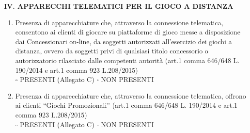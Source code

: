 \documentclass[12pt]{article}
\begin{document}
\begin{center}
    \textbf{IV. APPARECCHI TELEMATICI PER IL GIOCO A DISTANZA}
\end{center}
\begin{enumerate}[resume]
    \item Presenza di apparecchiature che, attraverso la connessione telematica, consentono ai clienti di giocare su piattaforme di gioco messe a disposizione dai Concessionari on-line, da soggetti autorizzati all’esercizio dei giochi a distanza, ovvero da soggetti privi di qualsiasi titolo concessorio o autorizzatorio rilasciato dalle competenti autorità (art.1 comma 646/648 L. 190/2014 e art.1 comma 923 L.208/2015)
    \\\begin{math} \square\end{math} PRESENTI (Allegato C) \begin{math}\square\end{math} NON PRESENTI
    \item Presenza di apparecchiature che, attraverso la connessione telematica, offrono ai clienti “Giochi Promozionali” (art.1 comma 646/648 L. 190/2014 e art.1 comma 923 L.208/2015)
    \\\begin{math} \square\end{math} PRESENTI (Allegato C) \begin{math}\square\end{math} NON PRESENTI
\end{enumerate}
\end{document}
